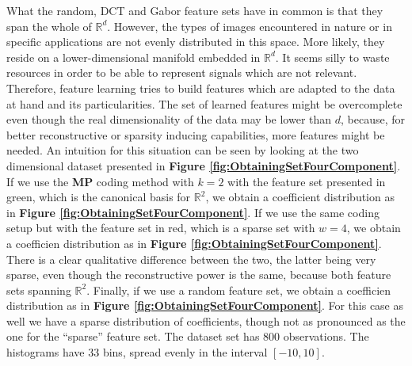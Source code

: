 \documentclass[12pt,a4paper,oneside,english]{UPBThesis}
\newcommand{\hcsignalspace}{\mathbb{R}^d}
\begin{document}
What the random, DCT and Gabor feature sets have in common is that they span the whole of $\hcsignalspace$. However, the types of images encountered in nature or in specific applications are not evenly distributed in this space. More likely, they reside on a lower-dimensional manifold embedded in $\hcsignalspace$. It seems silly to waste resources in order to be able to represent signals which are not relevant. Therefore, feature learning tries to build features which are adapted to the data at hand and its particularities. The set of learned features might be overcomplete even though the real dimensionality of the data may be lower than $d$, because, for better reconstructive or sparsity inducing capabilities, more features might be needed. An intuition for this situation can be seen by looking at the two dimensional dataset presented in \textbf{Figure \ref{fig:ObtainingSetFourComponent}}. If we use the \textbf{MP} coding method with $k=2$ with the feature set presented in green, which is the canonical basis for $\mathbb{R}^2$, we obtain a coefficient distribution as in \textbf{Figure \ref{fig:ObtainingSetFourComponent}}. If we use the same coding setup but with the feature set in red, which is a sparse set with $w=4$, we obtain a coefficien distribution as in \textbf{Figure \ref{fig:ObtainingSetFourComponent}}. There is a clear qualitative difference between the two, the latter being very sparse, even though the reconstructive power is the same, because both feature sets spanning $\mathbb{R}^2$. Finally, if we use a random feature set, we obtain a coefficien distribution as in \textbf{Figure \ref{fig:ObtainingSetFourComponent}}. For this case as well we have a sparse distribution of coefficients, though not as pronounced as the one for the ``sparse'' feature set. The dataset set has $800$ observations. The histograms have $33$ bins, spread evenly in the interval $[-10,10]$. 
\end{document}
